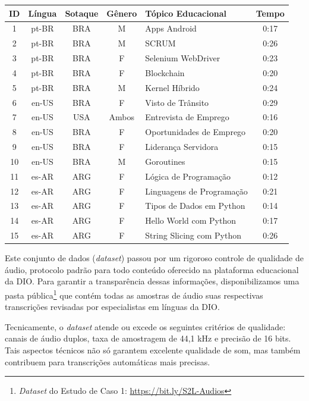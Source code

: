 \begin{quadro}[htb]
\centering
\caption{\textit{Dataset} do Estudo de Caso 1 (Áudios Extraídos das Videoaulas)}
\label{quadro:c4:poc-audios-summary}
\begin{tabular}{c|c|c|c|l|c}
\hline
\textbf{ID} & \textbf{Língua} & \textbf{Sotaque} & \textbf{Gênero} & \textbf{Tópico Educacional} & \textbf{Tempo} \\ \hline
1 & pt-BR & BRA & M & Apps Android & 0:17 \\ \hline
2 & pt-BR & BRA & M & SCRUM & 0:26 \\ \hline
3 & pt-BR & BRA & F & Selenium WebDriver & 0:23 \\ \hline
4 & pt-BR & BRA & F & Blockchain & 0:20 \\ \hline
5 & pt-BR & BRA & M & Kernel Híbrido & 0:24 \\ \hline
6 & en-US & BRA & F & Visto de Trânsito & 0:29 \\ \hline
7 & en-US & USA & Ambos & Entrevista de Emprego & 0:16 \\  \hline
8 & en-US & BRA & F & Oportunidades de Emprego & 0:20 \\  \hline
9 & en-US & BRA & F & Liderança Servidora & 0:15 \\  \hline
10 & en-US & BRA & M & Goroutines & 0:15 \\  \hline
11 & es-AR & ARG & F & Lógica de Programação & 0:12 \\  \hline
12 & es-AR & ARG & F & Linguagens de Programação & 0:21 \\  \hline
13 & es-AR & ARG & F & Tipos de Dados em Python & 0:14 \\  \hline
14 & es-AR & ARG & F & Hello World com Python & 0:17 \\  \hline
15 & es-AR & ARG & F & String Slicing com Python & 0:26 \\ \hline
\end{tabular}
\end{quadro}

Este conjunto de dados (\textit{dataset}) passou por um rigoroso controle de qualidade de áudio, protocolo padrão para todo conteúdo oferecido na plataforma educacional da DIO. Para garantir a transparência dessas informações, disponibilizamos uma pasta pública\footnote{\textit{Dataset} do Estudo de Caso 1: \url{https://bit.ly/S2L-Audios}} que contém todas as amostras de áudio suas respectivas transcrições revisadas por especialistas em línguas da DIO. 

Tecnicamente, o \textit{dataset} atende ou excede os seguintes critérios de qualidade: canais de áudio duplos, taxa de amostragem de 44,1 kHz e precisão de 16 bits. Tais aspectos técnicos não só garantem excelente qualidade de som, mas também contribuem para transcrições automáticas mais precisas.


